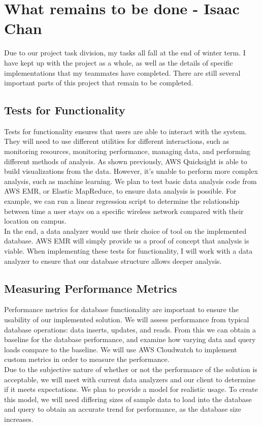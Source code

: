 \section{What remains to be done - Isaac Chan}
Due to our project task division, my tasks all fall at the end of winter term. I have kept up with the project as a whole, as well as the details of specific implementations that my teammates have completed. There are still several important parts of this project that remain to be completed.
	\subsection{Tests for Functionality}
Tests for functionality ensures that users are able to interact with the system. They will need to use different utilities for different interactions, such as monitoring resources, monitoring performance, managing data, and performing different methods of analysis. As shown previously, AWS Quicksight is able to build visualizations from the data. However, it’s unable to perform more complex analysis, such as machine learning. We plan to test basic data analysis code from AWS EMR, or Elastic MapReduce, to ensure data analysis is possible. For example, we can run a linear regression script to determine the relationship between time a user stays on a specific wireless network compared with their location on campus.\\ 

\noindent In the end, a data analyzer would use their choice of tool on the implemented database. AWS EMR will simply provide us a proof of concept that analysis is viable. When implementing these tests for functionality, I will work with a data analyzer to ensure that our database structure allows deeper analysis.
	\subsection{Measuring Performance Metrics}
Performance metrics for database functionality are important to ensure the usability of our implemented solution. We will assess performance from typical database operations: data inserts, updates, and reads. From this we can obtain a baseline for the database performance, and examine how varying data and query loads compare to the baseline. We will use AWS Cloudwatch to implement custom metrics in order to measure the performance.\\ 

\noindent Due to the subjective nature of whether or not the performance of the solution is acceptable, we will meet with current data analyzers and our client to determine if it meets expectations. We plan to provide a model for realistic usage. To create this model, we will need differing sizes of sample data to load into the database and query to obtain an accurate trend for performance, as the database size increases.
